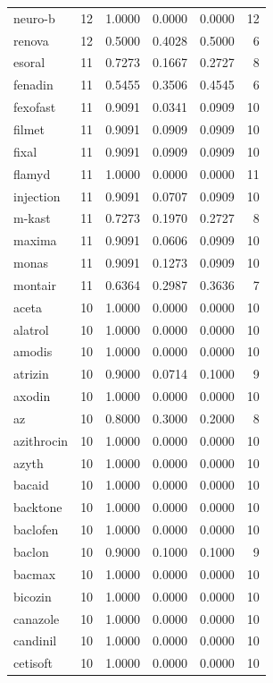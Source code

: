 \begin{longtable}{p{3.0cm}rrrrr}
neuro-b & 12 & 1.0000 & 0.0000 & 0.0000 & 12 \\
renova & 12 & 0.5000 & 0.4028 & 0.5000 & 6 \\
esoral & 11 & 0.7273 & 0.1667 & 0.2727 & 8 \\
fenadin & 11 & 0.5455 & 0.3506 & 0.4545 & 6 \\
fexofast & 11 & 0.9091 & 0.0341 & 0.0909 & 10 \\
filmet & 11 & 0.9091 & 0.0909 & 0.0909 & 10 \\
fixal & 11 & 0.9091 & 0.0909 & 0.0909 & 10 \\
flamyd & 11 & 1.0000 & 0.0000 & 0.0000 & 11 \\
injection & 11 & 0.9091 & 0.0707 & 0.0909 & 10 \\
m-kast & 11 & 0.7273 & 0.1970 & 0.2727 & 8 \\
maxima & 11 & 0.9091 & 0.0606 & 0.0909 & 10 \\
monas & 11 & 0.9091 & 0.1273 & 0.0909 & 10 \\
montair & 11 & 0.6364 & 0.2987 & 0.3636 & 7 \\
aceta & 10 & 1.0000 & 0.0000 & 0.0000 & 10 \\
alatrol & 10 & 1.0000 & 0.0000 & 0.0000 & 10 \\
amodis & 10 & 1.0000 & 0.0000 & 0.0000 & 10 \\
atrizin & 10 & 0.9000 & 0.0714 & 0.1000 & 9 \\
axodin & 10 & 1.0000 & 0.0000 & 0.0000 & 10 \\
az & 10 & 0.8000 & 0.3000 & 0.2000 & 8 \\
azithrocin & 10 & 1.0000 & 0.0000 & 0.0000 & 10 \\
azyth & 10 & 1.0000 & 0.0000 & 0.0000 & 10 \\
bacaid & 10 & 1.0000 & 0.0000 & 0.0000 & 10 \\
backtone & 10 & 1.0000 & 0.0000 & 0.0000 & 10 \\
baclofen & 10 & 1.0000 & 0.0000 & 0.0000 & 10 \\
baclon & 10 & 0.9000 & 0.1000 & 0.1000 & 9 \\
bacmax & 10 & 1.0000 & 0.0000 & 0.0000 & 10 \\
bicozin & 10 & 1.0000 & 0.0000 & 0.0000 & 10 \\
canazole & 10 & 1.0000 & 0.0000 & 0.0000 & 10 \\
candinil & 10 & 1.0000 & 0.0000 & 0.0000 & 10 \\
cetisoft & 10 & 1.0000 & 0.0000 & 0.0000 & 10 \\

\end{longtable}
